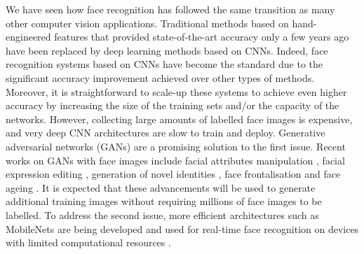 \documentclass[conference]{IEEEtran}
\begin{document}
We have seen how face recognition has followed the same transition as many other computer vision applications. Traditional methods based on hand-engineered features that provided state-of-the-art accuracy only a few years ago have been replaced by deep learning methods based on CNNs. Indeed, face recognition systems based on CNNs have become the standard due to the significant accuracy improvement achieved over other types of methods. Moreover, it is straightforward to scale-up these systems to achieve even higher accuracy by increasing the size of the training sets and/or the capacity of the networks. However, collecting large amounts of labelled face images is expensive, and very deep CNN architectures are slow to train and deploy. Generative adversarial networks (GANs) \cite{goodfellow2014generative} are a promising solution to the first issue. Recent works on GANs with face images include facial attributes manipulation \cite{larsen2015autoencoding,perarnau2016invertible,brock2016neural,shen2017learning,lu2017conditional,choi2017stargan,yin2017semi,shu2017neural,lample2017fader,he2017arbitrary}, facial expression editing \cite{zhou2017photorealistic,ding2017exprgan,choi2017stargan}, generation of novel identities \cite{donahue2017semantically}, face frontalisation \cite{huang2017beyond,tran2017representation} and face ageing \cite{antipov2017face,zhang2017age}. It is expected that these advancements will be used to generate additional training images without requiring millions of face images to be labelled. To address the second issue, more efficient architectures such as MobileNets \cite{howard2017mobilenets,sandler2018inverted} are being developed and used for real-time face recognition on devices with limited computational resources \cite{chen2018mobilefacenets}.




\end{document}
